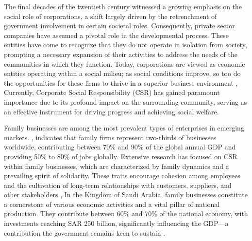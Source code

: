 \documentclass[10pt]{NSP1}
\begin{document}



\maketitle


\par\vspace{12.0pt}\vspace{12.0pt}

The final decades of the twentieth century witnessed a growing emphasis on the social role of corporations, a shift largely driven by the retrenchment of government involvement in certain societal roles. Consequently, private sector companies have assumed a pivotal role in the developmental process. These entities have come to recognize that they do not operate in isolation from society, prompting a necessary expansion of their activities to address the needs of the communities in which they function. Today, corporations are viewed as economic entities operating within a social milieu; as social conditions improve, so too do the opportunities for these firms to thrive in a superior business environment \cite{ref1}, Currently, Corporate Social Responsibility (CSR) has gained paramount importance due to its profound impact on the surrounding community, serving as an effective instrument for driving progress and achieving social welfare.

Family businesses are among the most prevalent types of enterprises in emerging markets. \cite{ref8}, indicates that family firms represent two-thirds of businesses worldwide, contributing between 70\% and 90\% of the global annual GDP and providing 50\% to 80\% of jobs globally. Extensive research has focused on CSR within family businesses, which are characterized by family dynamics and a prevailing spirit of solidarity. These traits encourage cohesion among employees and the cultivation of long-term relationships with customers, suppliers, and other stakeholders \cite{ref6}, In the Kingdom of Saudi Arabia, family businesses constitute a cornerstone of various economic activities and a vital pillar of national production. They contribute between 60\% and 70\% of the national economy, with investments reaching SAR 250 billion, significantly influencing the GDP—a contribution the government remains keen to sustain \cite{ref7} .
\end{document}
